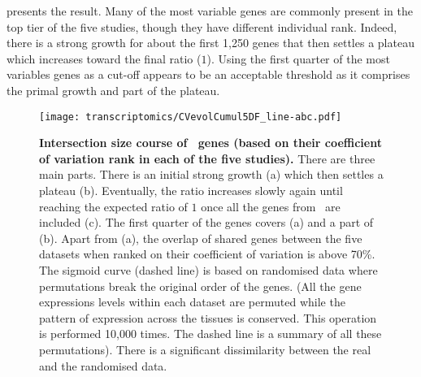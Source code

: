  presents the result.
Many of the most variable genes are commonly present in the top tier of the
five studies, though they have different individual rank.
Indeed, there is a strong growth for about the first 1,250 genes that then
settles a plateau which increases toward the final ratio ($1$).
Using the first quarter of the most variables genes as a cut-off appears
to be an acceptable threshold
as it comprises the primal growth and part of the plateau.

\begin{figure}[!ht]
    \texttt{[image: transcriptomics/CVevolCumul5DF\_line-abc.pdf]}\centering
    \caption[Intersection size of \setOne\ genes (ranked by cv)]%
    {\label{fig:cvEvol5DF}\textbf{Intersection size course
    of \setOne\ genes (based on their coefficient of variation rank
    in each of the five studies).}
    There are three main parts.
    There is an initial strong growth (a)
    which then settles a plateau (b).
    Eventually, the ratio increases slowly again
    until reaching the expected ratio of $1$ once all the genes from \setOne\
    are included (c).
    The first quarter of the genes covers (a) and a part of (b).
    Apart from (a),
    the overlap of shared genes between the five datasets when ranked on their
    coefficient of variation is above 70\%.
    The sigmoid curve (dashed line) is based on randomised data
    where permutations break the original order of the genes. (All the gene
    expressions levels within each dataset are permuted while the pattern of
    expression across the tissues is conserved. This operation is performed 10,000 times.
    The dashed line is a summary of all these permutations).
    There is a significant dissimilarity between the real and the randomised data.}
\end{figure}

